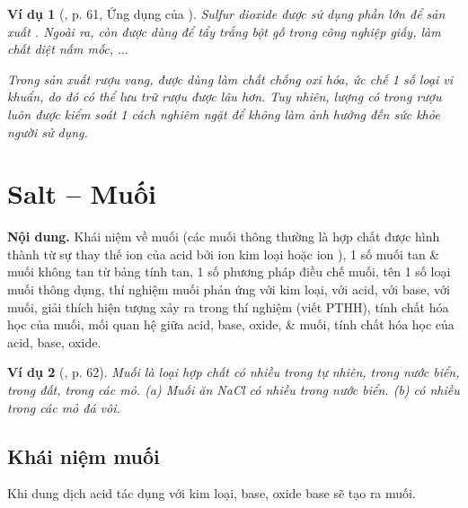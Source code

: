 \documentclass{article}
\newtheorem{vidu}{Ví dụ}
\begin{document}
\begin{vidu}[\cite{SGK_KHTN_8_Canh_Dieu}, p. 61, Ứng dụng của ]
	Sulfur dioxide \emph{} được sử dụng phần lớn để sản xuất \emph{}. Ngoài ra, \emph{} còn được dùng để tẩy trắng bột gỗ trong công nghiệp giấy, làm chất diệt nấm mốc, $\ldots$
	
	Trong sản xuất rượu vang, \emph{} được dùng làm chất chống oxi hóa, ức chế 1 số loại vi khuẩn, do đó có thể lưu trữ rượu được lâu hơn. Tuy nhiên, lượng \emph{} có trong rượu luôn được kiểm soát 1 cách nghiêm ngặt để không làm ảnh hưởng đến sức khỏe người sử dụng.
\end{vidu}

\noindent{}


\section{Salt -- Muối}
\textsf{\textbf{Nội dung.} Khái niệm về muối (các muối thông thường là hợp chất được hình thành từ sự thay thế ion  của acid bởi ion kim loại hoặc ion ), 1 số muối tan \& muối không tan từ bảng tính tan, 1 số phương pháp điều chế muối, tên 1 số loại muối thông dụng, thí nghiệm muối phản ứng với kim loại, với acid, với base, với muối, giải thích hiện tượng xảy ra trong thí nghiệm (viết PTHH), tính chất hóa học của muối, mối quan hệ giữa acid, base, oxide, \& muối, tính chất hóa học của acid, base, oxide.}

\begin{vidu}[\cite{SGK_KHTN_8_Canh_Dieu}, p. 62]
	Muối là loại hợp chất có nhiều trong tự nhiên, trong nước biển, trong đất, trong các mỏ. (a) Muối ăn \emph{NaCl} có nhiều trong nước biển. (b) \emph{} có nhiều trong các mỏ đá vôi.
\end{vidu}

\subsection{Khái niệm muối}
Khi dung dịch acid tác dụng với kim loại, base, oxide base sẽ tạo ra muối.
\end{document}
